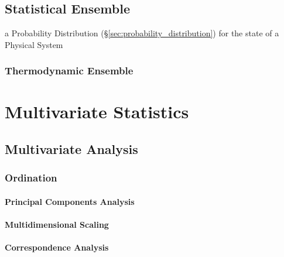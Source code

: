 \subsection{Statistical Ensemble}\label{sec:statistical_ensemble}

a Probability Distribution (\S\ref{sec:probability_distribution}) for the state
of a Physical System



\subsubsection{Thermodynamic Ensemble}\label{sec:thermodynamic_ensemble}



\section{Multivariate Statistics}\label{sec:multivariate_statistics}

\subsection{Multivariate Analysis}\label{sec:multivariate_analysis}

\subsubsection{Ordination}\label{sec:ordination}

\paragraph{Principal Components Analysis}
\label{sec:principal_components_analysis}\hfill

\paragraph{Multidimensional Scaling}\label{sec:multidimensional_scaling}\hfill

\paragraph{Correspondence Analysis}\label{sec:correspondence_analysis}\hfill

